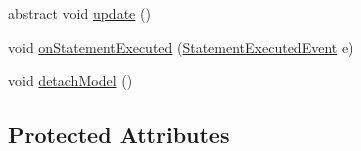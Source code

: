 \begin{DoxyCompactItemize}
\item 
abstract void \hyperlink{classorg_1_1tzi_1_1use_1_1gui_1_1views_1_1selection_1_1_class_selection_view_a95ac92786b8a5824426f3b3ddf449bb4}{update} ()
\item 
void \hyperlink{classorg_1_1tzi_1_1use_1_1gui_1_1views_1_1selection_1_1_class_selection_view_a5322f74905ccd3e1b7c438c3e3f5cdf8}{on\-Statement\-Executed} (\hyperlink{classorg_1_1tzi_1_1use_1_1uml_1_1sys_1_1events_1_1_statement_executed_event}{Statement\-Executed\-Event} e)
\item 
void \hyperlink{classorg_1_1tzi_1_1use_1_1gui_1_1views_1_1selection_1_1_class_selection_view_aa3acb3eb232bab022c4750acb270ea77}{detach\-Model} ()
\end{DoxyCompactItemize}
\subsection*{Protected Attributes}
